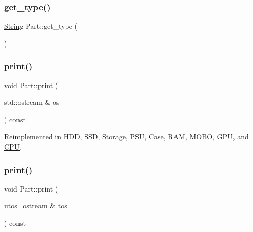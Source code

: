 \subsubsection{\texorpdfstring{get\_type()}{get\_type()}}
{\footnotesize\ttfamily \mbox{\hyperlink{class_string}{String}} Part\+::get\+\_\+type (\begin{DoxyParamCaption}{ }\end{DoxyParamCaption})\hspace{0.3cm}{\ttfamily [inline]}}

\mbox{\label{class_part_a4fa402b8e8fd4236ff773a7697ab2bc3}} 
\subsubsection{\texorpdfstring{print()}{print()}\hspace{0.1cm}{\footnotesize\ttfamily [1/2]}}
{\footnotesize\ttfamily void Part\+::print (\begin{DoxyParamCaption}\item[{std\+::ostream \&}]{os }\end{DoxyParamCaption}) const\hspace{0.3cm}{\ttfamily [virtual]}}



Reimplemented in \mbox{\hyperlink{class_h_d_d_a07c34356018542934a4dd91ce38b0821}{H\+DD}}, \mbox{\hyperlink{class_s_s_d_a3c07aa0fd7bb547cfb4a775513e427a9}{S\+SD}}, \mbox{\hyperlink{class_storage_aa9f6ffb0fd45839b54bd4e254270445d}{Storage}}, \mbox{\hyperlink{class_p_s_u_ad8f95676e09f5ba805dbba50759f44ba}{P\+SU}}, \mbox{\hyperlink{class_case_a9e54f42dcb7b62f1792a6475ce60aa79}{Case}}, \mbox{\hyperlink{class_r_a_m_a2f226659cbc23f841d73525572ba9574}{R\+AM}}, \mbox{\hyperlink{class_m_o_b_o_a3241f425030e01d5b7a192c23af2dbda}{M\+O\+BO}}, \mbox{\hyperlink{class_g_p_u_abfa2a8fa30047e9759080d724e4b3820}{G\+PU}}, and \mbox{\hyperlink{class_c_p_u_ad4d3ebb288deeaad640e034bdb71a40a}{C\+PU}}.

\mbox{\label{class_part_a9ecabe44ba3415badf82c6a23617a41e}} 
\subsubsection{\texorpdfstring{print()}{print()}\hspace{0.1cm}{\footnotesize\ttfamily [2/2]}}
{\footnotesize\ttfamily void Part\+::print (\begin{DoxyParamCaption}\item[{\mbox{\hyperlink{structutos__ostream}{utos\+\_\+ostream}} \&}]{tos }\end{DoxyParamCaption}) const\hspace{0.3cm}{\ttfamily [virtual]}}



